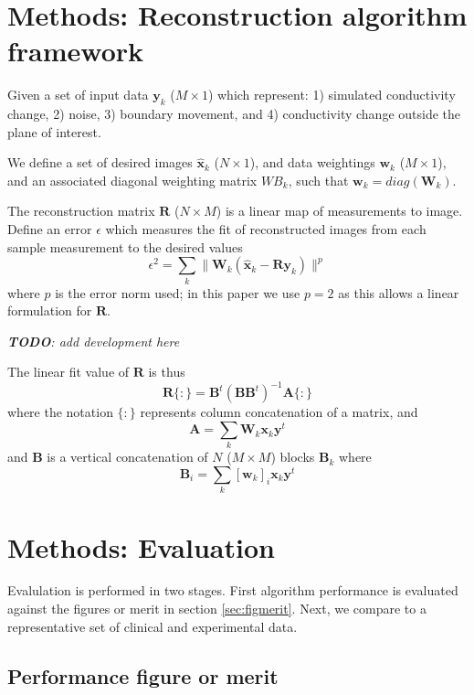 \documentclass[12pt]{iopart}
\newcommand{\xB}{\mbox{$\mathbf{x}$}}
\newcommand{\xH}{\mbox{$\mathbf{\hat x}$}}
\newcommand{\yB}{\mbox{$\mathbf{y}$}}
\newcommand{\wB}{\mbox{$\mathbf{w}$}}
\newcommand{\AB}{\mbox{$\mathbf{A}$}}
\newcommand{\BB}{\mbox{$\mathbf{B}$}}
\newcommand{\WB}{\mbox{$\mathbf{W}$}}
\newcommand{\RB}{\mbox{$\mathbf{R}$}}
\begin{document}
\section{Methods: Reconstruction algorithm framework}

Given a set of input data $\yB_k$ ($M\times1$) which 
represent:
1) simulated conductivity change,
2) noise,
3) boundary movement,
and
4) conductivity change outside the plane of interest.

We define a set of desired images $\xH_k$ ($N\times1$),
and data weightings $\wB_k$ ($M\times1$), and an associated
diagonal weighting matrix $WB_k$, such that 
$\wB_k = diag(\WB_k)$.

The reconstruction matrix $\RB$ ($N\times M$) is a linear
map of measurements to image.
Define an error $\epsilon$ which measures the fit
of reconstructed images from each sample measurement to
the desired values
\begin{equation}
\epsilon^2 =
\sum_k \|\WB_k ( \xH_k - \RB \yB_k ) \|^p
\end{equation}
where $p$ is the error norm used; in this paper we use $p=2$
as this allows a linear formulation for $\RB$. 

{\em {\bf TODO}: add development here}

The linear fit value of $\RB$ is thus
\begin{equation}
\RB\{:\} = \BB^t (\BB \BB^t)^{-1} \AB\{:\}
\end{equation}
where the notation $\{:\}$ represents column
concatenation of a matrix, and
\begin{equation}
\AB = \sum_k \WB_k \xB_k \yB^t
\end{equation}
and $\BB$ is a vertical concatenation of $N$
($M \times M$) blocks $\BB_k$ where
\begin{equation}
\BB_i = \sum_k [\wB_k]_i \xB_k \yB^t
\end{equation}




\section{Methods: Evaluation}

Evalulation is performed in two stages. First algorithm performance
is evaluated against the figures or merit in section
\ref{sec:figmerit}.
Next, we compare to a representative set of  clinical 
and experimental data.

\subsection{Performance figure or merit}
\end{document}
